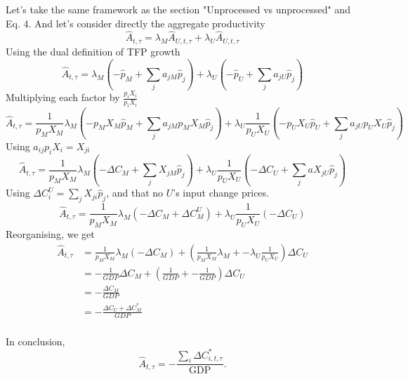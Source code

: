 \documentclass[11pt]{article}
\begin{document}
Let's take the same framework as the section "Unprocessed vs unprocessed" and Eq. 4. And let's consider directly the aggregate productivity
\begin{equation*}
    \hat{A}_{t,\tau} =\lambda_M\hat{A}_{U,t,\tau}+\lambda_U\hat{A}_{U,t,\tau}
\end{equation*}
Using the dual definition of TFP growth
\begin{equation*}
\hat{A}_{t,\tau} =\lambda_M\left(-\hat{p}_M + \sum_j a_{jM} \hat{p}_{j} \right)+\lambda_U\left(-\hat{p}_U + \sum_j a_{jU} \hat{p}_{j} \right)
\end{equation*}
Multiplying each factor by $\frac{p_iX_i}{p_iX_i}$
\begin{equation*}
   \hat{A}_{t,\tau} = \frac{1}{p_MX_M}\lambda_M\left(-p_MX_M\hat{p}_M + \sum_j a_{jM}p_MX_M \hat{p}_{j} \right)+
     \lambda_U\frac{1}{p_UX_U}\left(-p_UX_U\hat{p}_U +\sum_j a_{jU} p_UX_U\hat{p}_{j}\right)
     \end{equation*}
Using $a_{ij}p_iX_i=X_{ji}$
\begin{equation*}
         \hat{A}_{t,\tau} = \frac{1}{p_MX_M}\lambda_M\left(-\Delta C_M + \sum_j X_{jM}\hat{p}_{j} \right)+
     \lambda_U\frac{1}{p_UX_U}\left(-\Delta C_U +\sum_j aX_{jU}\hat{p}_{j}  \right)
     \end{equation*}
Using $\Delta C_i^{U} = \sum_j X_{ji} \hat{p}_{j}$, and that no $U$'s input change prices.
\begin{equation*}
        \hat{A}_{t,\tau} = \frac{1}{p_MX_M}\lambda_M\left(-\Delta C_M + \Delta C_M^{U}\right)+
     \lambda_U\frac{1}{p_UX_U}\left(-\Delta C_U \right)
\end{equation*}
Reorganising, we get
\begin{align*}
    \hat{A}_{t,\tau} &= \frac{1}{p_MX_M}\lambda_M(-\Delta C_M)+  \left(\frac{1}{p_MX_M}\lambda_M+
    - \lambda_U\frac{1}{p_UX_U}\right)\Delta C_U \\
      &=- \frac{1}{GDP}\Delta C_M+  \left(\frac{1}{GDP}+
    - \frac{1}{GDP}\right)\Delta C_U \\
       &=- \frac{\Delta C_M}{GDP} \\
        &=- \frac{\Delta C_U+\Delta C_M^*}{GDP} \\
\end{align*}


In conclusion,
\begin{equation}
\label{eq_ahat_t_tau_ccc_no_zeta}
 \hat{A}_{t,\tau} = - \frac{\sum_i \Delta C^*_{i,t,\tau}}{\text{GDP}}.
\end{equation}
\end{document}
